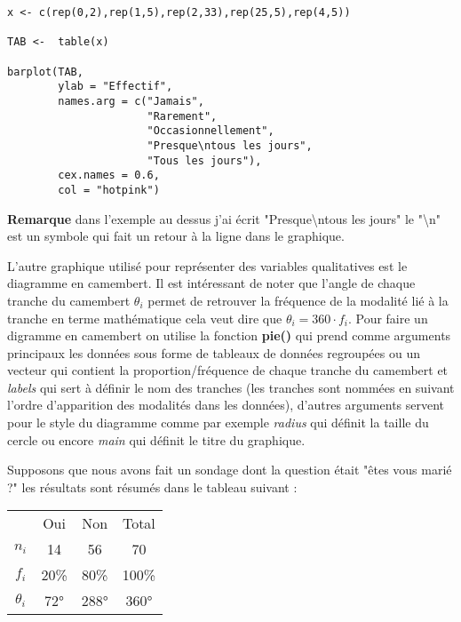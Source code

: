 \documentclass{report}
\begin{document}
\newpage

\begin{verbatim}
x <- c(rep(0,2),rep(1,5),rep(2,33),rep(25,5),rep(4,5))

TAB <-  table(x)

barplot(TAB, 
        ylab = "Effectif",
        names.arg = c("Jamais", 
                      "Rarement", 
                      "Occasionnellement", 
                      "Presque\ntous les jours", 
                      "Tous les jours"), 
        cex.names = 0.6, 
        col = "hotpink")

\end{verbatim}

\textbf{Remarque} dans l'exemple au dessus j'ai écrit "Presque\textbackslash ntous les jours" le "\textbackslash n" est un symbole qui fait un retour à la ligne dans le graphique.

L'autre graphique utilisé pour représenter des variables qualitatives est le diagramme en camembert. Il est intéressant de noter que l'angle de chaque tranche du camembert  $\theta_i$ permet de retrouver la fréquence de la modalité lié à la tranche en terme mathématique cela veut dire que  $\theta_i = 360\cdot f_i$. Pour faire un digramme en camembert on utilise la fonction \textbf{pie()} qui prend comme arguments principaux les données sous forme de tableaux de données regroupées ou un vecteur qui contient la proportion/fréquence de chaque tranche du camembert et \textit{labels} qui sert à définir le nom des tranches (les tranches sont nommées en suivant l'ordre d'apparition des modalités dans les données), d'autres arguments servent pour le style du diagramme comme par exemple \textit{radius} qui définit la taille du cercle ou encore \textit{main} qui définit le titre du graphique. 

Supposons que nous avons fait un sondage dont la question était "êtes vous marié ?" les résultats sont résumés dans le tableau suivant :

\quad
\begin{center}
\begin{tabular}{c c c c} 
\hline
  &Oui&Non&Total\\ \cline{2-4}
$n_i$ & 14 & 56& 70  \\
$f_i$ & 20\% & 80\%&100\%  \\
$\theta_i$ & 72°&288°&360°  \\
\hline
\end{tabular}
\end{center}
\quad
\end{document}
